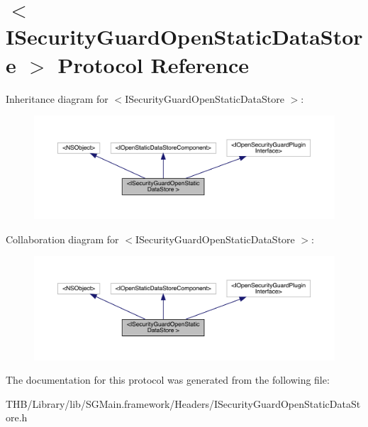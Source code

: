 \hypertarget{protocol_i_security_guard_open_static_data_store_01-p}{}\section{$<$I\+Security\+Guard\+Open\+Static\+Data\+Store $>$ Protocol Reference}
\label{protocol_i_security_guard_open_static_data_store_01-p}


Inheritance diagram for $<$I\+Security\+Guard\+Open\+Static\+Data\+Store $>$\+:\nopagebreak
\begin{figure}[H]
\begin{center}
\leavevmode
\includegraphics[width=350pt]{protocol_i_security_guard_open_static_data_store_01-p__inherit__graph}
\end{center}
\end{figure}


Collaboration diagram for $<$I\+Security\+Guard\+Open\+Static\+Data\+Store $>$\+:\nopagebreak
\begin{figure}[H]
\begin{center}
\leavevmode
\includegraphics[width=350pt]{protocol_i_security_guard_open_static_data_store_01-p__coll__graph}
\end{center}
\end{figure}


The documentation for this protocol was generated from the following file\+:\begin{DoxyCompactItemize}
\item 
T\+H\+B/\+Library/lib/\+S\+G\+Main.\+framework/\+Headers/I\+Security\+Guard\+Open\+Static\+Data\+Store.\+h\end{DoxyCompactItemize}
